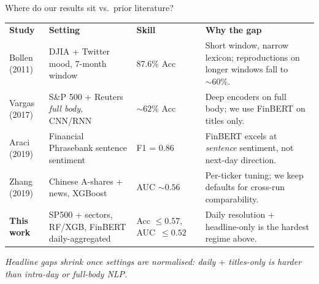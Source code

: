 \documentclass[aspectratio=169,11pt]{beamer}
\begin{document}
\begin{frame}{Where do our results sit vs.\ prior literature?}
\scriptsize
\begin{center}
\renewcommand{\arraystretch}{1.30}
\setlength{\tabcolsep}{5pt}
\begin{tabular}{@{}p{2.0cm} p{3.5cm} p{1.7cm} p{4.6cm}@{}}
\rowcolor{TecBlue}
{\color{white}\textbf{Study}} & {\color{white}\textbf{Setting}} & {\color{white}\textbf{Skill}} & {\color{white}\textbf{Why the gap}} \\
Bollen (2011) & DJIA + Twitter mood, 7-month window & 87.6\% Acc & Short window, narrow lexicon; reproductions on longer windows fall to $\sim 60\%$. \\
Vargas (2017) & S\&P 500 + Reuters \textit{full body}, CNN/RNN & $\sim 62\%$ Acc & Deep encoders on full body; we use FinBERT on titles only. \\
Araci (2019)  & Financial Phrasebank sentence sentiment & F1 = 0.86 & FinBERT excels at \textit{sentence} sentiment, not next-day direction. \\
Zhang (2019)  & Chinese A-shares + news, XGBoost & AUC $\sim 0.56$ & Per-ticker tuning; we keep defaults for cross-run comparability. \\
\rowcolor{TecGold!28}
\textbf{This work} & SP500 + sectors, RF/XGB, FinBERT daily-aggregated & Acc $\le 0.57$, \mbox{AUC $\le 0.52$} & Daily resolution + headline-only is the hardest regime above. \\
\end{tabular}
\end{center}

\vspace{4pt}
\begin{center}\scriptsize\itshape\color{TecGray}
Headline gaps shrink once settings are normalised: daily $+$ titles-only is harder than intra-day or full-body NLP.
\end{center}
\end{frame}
\end{document}
